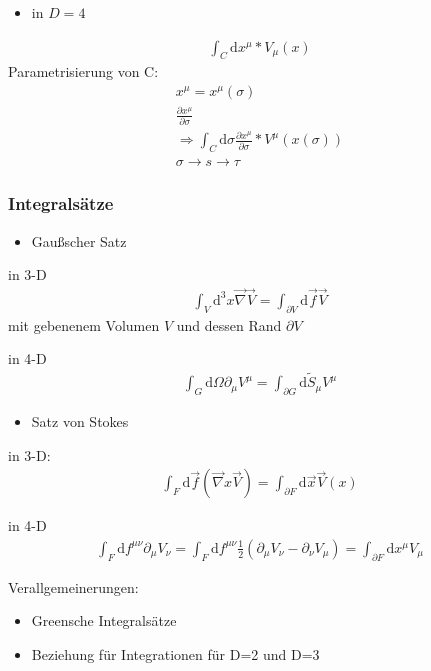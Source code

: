 \documentclass[a4paper]{article}
\begin{document}
\begin{itemize}
  \item in $D=4$
\end{itemize}
\begin{align}
\int_C \mathrm{d}x^\mu*V_\mu(x)
\end{align}
Parametrisierung von C:
\begin{align}
x^\mu=x^\mu(\sigma)\\
\frac{\partial x^\mu}{\partial\sigma}\\
\Rightarrow\int_C \mathrm{d}\sigma \frac{\partial x^\mu}{\partial\sigma}*
V^\mu(x(\sigma))\\
\sigma\rightarrow s \rightarrow\tau
\end{align}

\subsubsection{Integralsätze}
\begin{itemize}
  \item Gaußscher Satz
\end{itemize}
in 3-D
\begin{align}
\int_V \mathrm{d}^3x \vec\nabla \vec{V} = \int_{\partial V} \mathrm{d}\vec{f} \vec{V}
\end{align}
mit gebenenem Volumen $V$ und dessen Rand $\partial V$

in 4-D
\begin{align}
\int_G \mathrm{d}\Omega \partial_\mu V^\mu = \int_{\partial G} \mathrm{d}\tilde{S}_\mu V^\mu
\end{align}

\begin{itemize}
  \item Satz von Stokes
\end{itemize}

in 3-D:
\begin{align}
\int_F \mathrm{d}\vec{f} (\vec{\nabla}x\vec{V}) = \int_{\partial F} \mathrm{d}\vec{x} \vec{V}(x)
\end{align}

in 4-D
\begin{align}
\int_F \mathrm{d}f^{\mu\nu} \partial_\mu V_\nu= \int_F \mathrm{d}f^{\mu\nu}
\frac{1}{2}(\partial_\mu V_\nu-\partial_\nu V_\mu) = \int_{\partial F}
\mathrm{d}x^\mu V_\mu
\end{align}

Verallgemeinerungen:\\
\begin{itemize}
  \item Greensche Integralsätze
  \item Beziehung für Integrationen für D=2 und D=3  
\end{itemize}
\end{document}
